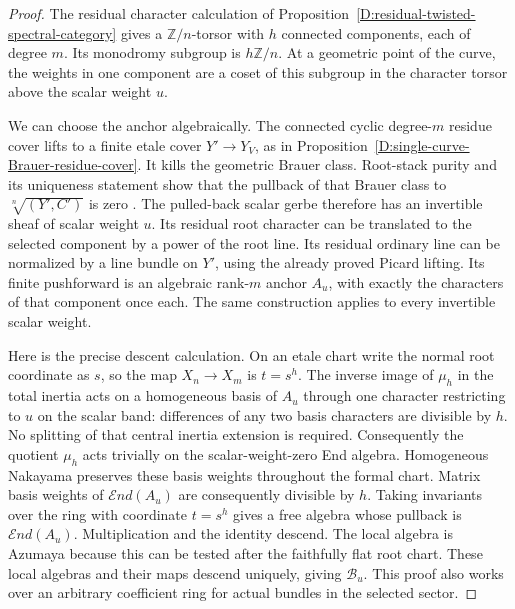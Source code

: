 \begin{proof}
The residual character calculation of
Proposition~\ref{D:residual-twisted-spectral-category}
gives a $\mathbb Z/n$-torsor with $h$ connected
components, each of degree $m$. Its monodromy subgroup
is $h\mathbb Z/n$. At a geometric point of the curve,
the weights in one component are a coset of this
subgroup in the character torsor above the scalar
weight $u$.

We can choose the anchor algebraically. The connected
cyclic degree-$m$ residue cover lifts to a finite etale
cover $Y'\to Y_V$, as in
Proposition~\ref{D:single-curve-Brauer-residue-cover}.
It kills the geometric Brauer class. Root-stack purity
and its uniqueness statement show that the pullback
of that Brauer class to $\sqrt[n]{(Y',C')}$ is zero
\citep[Proposition3.2.1 and complete proof]
{Lieblich2011ResidualD}.
The pulled-back scalar gerbe therefore has an invertible
sheaf of scalar weight $u$. Its residual root character
can be translated to the selected component by a power
of the root line. Its residual ordinary line can be
normalized by a line bundle on $Y'$, using the already
proved Picard lifting. Its finite pushforward is an
algebraic rank-$m$ anchor $A_u$, with exactly the
characters of that component once each. The same
construction applies to every invertible scalar weight.

Here is the precise descent calculation. On an etale
chart write the normal root coordinate as $s$, so the
map $X_n\to X_m$ is $t=s^h$. The inverse image of $\mu_h$ in the total inertia
acts on a homogeneous basis of $A_u$ through one
character restricting to $u$ on the scalar band:
differences of any two basis characters are divisible
by $h$. No splitting of that central inertia extension
is required. Consequently the quotient $\mu_h$ acts
trivially on the scalar-weight-zero End algebra. Homogeneous Nakayama
preserves these basis weights throughout the formal
chart. Matrix basis weights of $\mathcal End(A_u)$
are consequently divisible by $h$. Taking invariants
over the ring with coordinate $t=s^h$ gives a free
algebra whose pullback is $\mathcal End(A_u)$.
Multiplication and the identity descend. The local
algebra is Azumaya because this can be tested after
the faithfully flat root chart. These local algebras
and their maps descend uniquely, giving $\mathcal B_u$.
This proof also works over an arbitrary coefficient
ring for actual bundles in the selected sector.


\end{proof}
